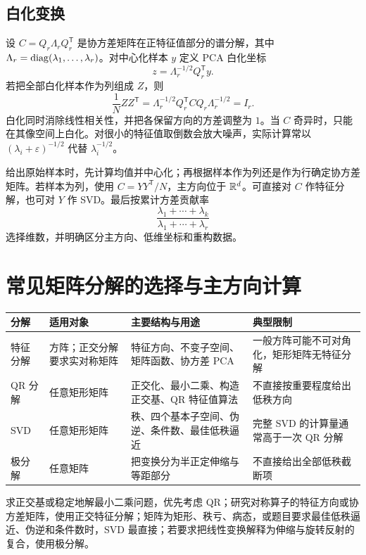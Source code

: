 \subsection{白化变换}

设 $C=Q_r\Lambda_rQ_r^{\mathsf T}$ 是协方差矩阵在正特征值部分的谱分解，其中
$\Lambda_r=\operatorname{diag}(\lambda_1,\ldots,\lambda_r)$。对中心化样本 $y$ 定义 PCA 白化坐标
\[
z=\Lambda_r^{-1/2}Q_r^{\mathsf T}y.
\]
若把全部白化样本作为列组成 $Z$，则
\[
\frac1NZZ^{\mathsf T}
=\Lambda_r^{-1/2}Q_r^{\mathsf T}CQ_r\Lambda_r^{-1/2}
=I_r.
\]
白化同时消除线性相关性，并把各保留方向的方差调整为 $1$。当 $C$ 奇异时，只能在其像空间上白化。对很小的特征值取倒数会放大噪声，实际计算常以
$(\lambda_i+\varepsilon)^{-1/2}$ 代替 $\lambda_i^{-1/2}$。

\begin{method}
给出原始样本时，先计算均值并中心化；再根据样本作为列还是作为行确定协方差矩阵。若样本为列，使用 $C=YY^{\mathsf T}/N$，主方向位于 $\mathbb{R}^d$。可直接对 $C$ 作特征分解，也可对 $Y$ 作 SVD。最后按累计方差贡献率
\[
\frac{\lambda_1+\cdots+\lambda_k}{\lambda_1+\cdots+\lambda_r}
\]
选择维数，并明确区分主方向、低维坐标和重构数据。
\end{method}

\section{常见矩阵分解的选择与主方向计算}

\begin{center}
\begin{tabular}{p{2.0cm}p{3.1cm}p{4.2cm}p{3.7cm}}
\toprule
分解 & 适用对象 & 主要结构与用途 & 典型限制\\
\midrule
特征分解 & 方阵；正交分解要求实对称矩阵 & 特征方向、不变子空间、矩阵函数、协方差 PCA & 一般方阵可能不可对角化，矩形矩阵无特征分解\\
QR 分解 & 任意矩形矩阵 & 正交化、最小二乘、构造正交基、QR 特征值算法 & 不直接按重要程度给出低秩方向\\
SVD & 任意矩形矩阵 & 秩、四个基本子空间、伪逆、条件数、最佳低秩逼近 & 完整 SVD 的计算量通常高于一次 QR 分解\\
极分解 & 任意矩阵 & 把变换分为半正定伸缩与等距部分 & 不直接给出全部低秩截断项\\
\bottomrule
\end{tabular}
\end{center}

\begin{method}[分解方法的触发特征]
求正交基或稳定地解最小二乘问题，优先考虑 QR；研究对称算子的特征方向或协方差矩阵，使用正交特征分解；矩阵为矩形、秩亏、病态，或题目要求最佳低秩逼近、伪逆和条件数时，SVD 最直接；若要求把线性变换解释为伸缩与旋转反射的复合，使用极分解。
\end{method}

